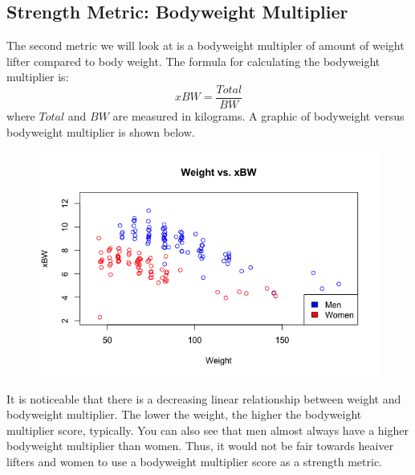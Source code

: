 \documentclass[10pt,letterpaper]{article}
\begin{document}
    \subsection{Strength Metric: Bodyweight Multiplier}
    The second metric we will look at is a bodyweight multipler of amount of weight lifter compared to body weight. The formula for calculating the bodyweight multiplier is: $$xBW = \frac{Total}{BW}$$ where $Total$ and $BW$ are measured in kilograms. A graphic of bodyweight versus bodyweight multiplier is shown below. 

    \begin{figure}[H]
        \center
        \includegraphics[width=35em]{weightVSbw.png}
        \label{xBW}
    \end{figure}

    It is noticeable that there is a decreasing linear relationship between weight and bodyweight multiplier. The lower the weight, the higher the bodyweight multiplier score, typically. You can also see that men almost always have a higher bodyweight multiplier than women. Thus, it would not be fair towards heaiver lifters and women to use a bodyweight multiplier score as a strength metric.
\end{document}

